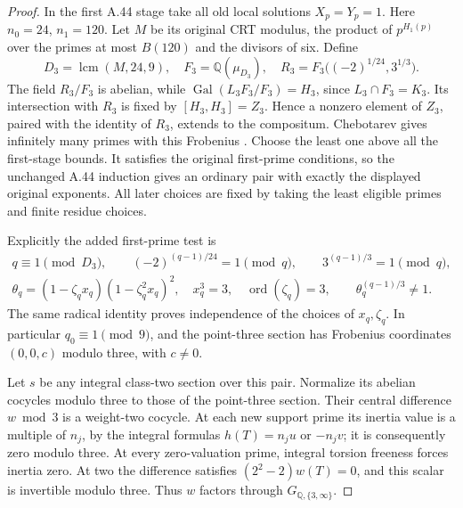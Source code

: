 \begin{proof}
In the first A.44 stage take all old local solutions
\(X_p=Y_p=1\). Here \(n_0=24\), \(n_1=120\).
Let \(M\) be its original CRT modulus, the product
of \(p^{H_1(p)}\) over the primes at most
\(B(120)\) and the divisors of six. Define
\[
 D_3=\operatorname{lcm}(M,24,9),\quad
 F_3=\mathbb Q(\mu_{D_3}),\quad
 R_3=F_3\bigl((-2)^{1/24},3^{1/3}\bigr).
\]
The field \(R_3/F_3\) is abelian, while
\(\operatorname{Gal}(L_3F_3/F_3)=H_3\), since
\(L_3\cap F_3=K_3\). Its intersection with
\(R_3\) is fixed by \([H_3,H_3]=Z_3\).
Hence a nonzero element of \(Z_3\), paired with
the identity of \(R_3\), extends to the compositum.
Chebotarev gives infinitely many primes with this
Frobenius \cite[Theorem 8.31]{GhostMilneANT}.
Choose the least one above all the first-stage bounds.
It satisfies the original first-prime conditions,
so the unchanged A.44 induction gives an ordinary
pair with exactly the displayed original exponents.
All later choices are fixed by taking the least
eligible primes and finite residue choices.

Explicitly the added first-prime test is
\[
 \begin{gathered}
 q\equiv1\pmod{D_3},\qquad
 (-2)^{(q-1)/24}=1\pmod q,\qquad
 3^{(q-1)/3}=1\pmod q,\\
 \theta_q=(1-\zeta_qx_q)(1-\zeta_q^2x_q)^2,
 \quad x_q^3=3,\quad \operatorname{ord}(\zeta_q)=3,
 \qquad \theta_q^{(q-1)/3}\ne1.
 \end{gathered}                                      \tag{7}
\]
The same radical identity proves independence of the
choices of \(x_q,\zeta_q\). In particular
\(q_0\equiv1\pmod9\), and the point-three section
has Frobenius coordinates
\((0,0,c)\) modulo three, with \(c\ne0\).

Let \(s\) be any integral class-two section over this
pair. Normalize its abelian cocycles modulo three
to those of the point-three section. Their central
difference \(w\bmod3\) is a weight-two cocycle.
At each new support prime its inertia value is a
multiple of \(n_j\), by the integral formulas
\(h(T)=n_ju\) or \(-n_jv\); it is consequently
zero modulo three. At every zero-valuation prime,
integral torsion freeness forces inertia zero.
At two the difference satisfies
\((2^2-2)w(T)=0\), and this scalar is invertible
modulo three. Thus \(w\) factors through
\(G_{\mathbb Q,\{3,\infty\}}\).


\end{proof}
